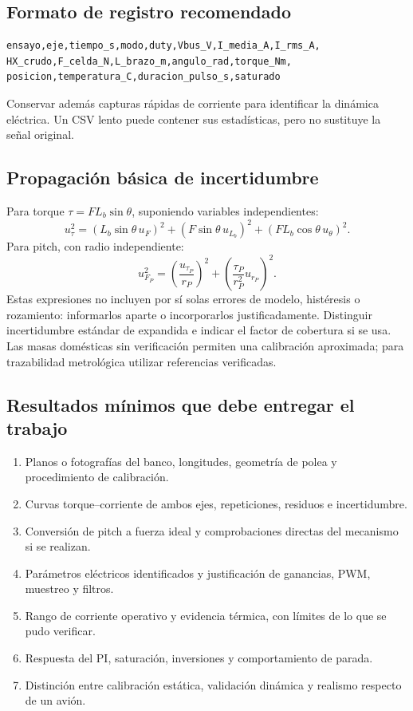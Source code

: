 \documentclass[11pt,a4paper]{article}
\begin{document}
\subsection{Formato de registro recomendado}
\begin{lstlisting}
ensayo,eje,tiempo_s,modo,duty,Vbus_V,I_media_A,I_rms_A,
HX_crudo,F_celda_N,L_brazo_m,angulo_rad,torque_Nm,
posicion,temperatura_C,duracion_pulso_s,saturado
\end{lstlisting}
Conservar además capturas rápidas de corriente para identificar la dinámica eléctrica. Un CSV lento puede contener sus estadísticas, pero no sustituye la señal original.

\subsection{Propagación básica de incertidumbre}
Para torque $\tau=FL_b\sin\theta$, suponiendo variables independientes:
\begin{equation}
u_\tau^2=(L_b\sin\theta\,u_F)^2+
(F\sin\theta\,u_{L_b})^2+(FL_b\cos\theta\,u_\theta)^2.
\end{equation}
Para pitch, con radio independiente:
\begin{equation}
u_{F_P}^2=\left(\frac{u_{\tau_P}}{r_P}\right)^2+
\left(\frac{\tau_P}{r_P^2}u_{r_P}\right)^2.
\end{equation}
Estas expresiones no incluyen por sí solas errores de modelo, histéresis o rozamiento: informarlos aparte o incorporarlos justificadamente. Distinguir incertidumbre estándar de expandida e indicar el factor de cobertura si se usa. Las masas domésticas sin verificación permiten una calibración aproximada; para trazabilidad metrológica utilizar referencias verificadas.

\subsection{Resultados mínimos que debe entregar el trabajo}
\begin{enumerate}
\item Planos o fotografías del banco, longitudes, geometría de polea y procedimiento de calibración.
\item Curvas torque--corriente de ambos ejes, repeticiones, residuos e incertidumbre.
\item Conversión de pitch a fuerza ideal y comprobaciones directas del mecanismo si se realizan.
\item Parámetros eléctricos identificados y justificación de ganancias, PWM, muestreo y filtros.
\item Rango de corriente operativo y evidencia térmica, con límites de lo que se pudo verificar.
\item Respuesta del PI, saturación, inversiones y comportamiento de parada.
\item Distinción entre calibración estática, validación dinámica y realismo respecto de un avión.
\end{enumerate}
\end{document}
